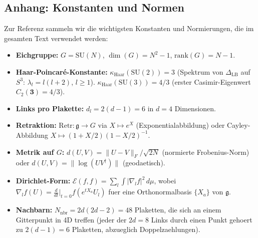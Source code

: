 \documentclass[12pt,a4paper]{article}
\theoremstyle{definition}
\theoremstyle{plain}
\theoremstyle{remark}
\begin{document}
\subsection*{Anhang: Konstanten und Normen}
\label{app:constants}

Zur Referenz sammeln wir die wichtigsten Konstanten und Normierungen, die im gesamten Text verwendet werden:

\begin{itemize}
\item \textbf{Eichgruppe:} $G = \mathrm{SU}(N)$, $\dim(G) = N^2 - 1$, $\mathrm{rank}(G) = N-1$.
\item \textbf{Haar-Poincar\'e-Konstante:} $\kappa_{\mathrm{Haar}}(\mathrm{SU}(2)) = 3$ (Spektrum von $\Delta_{\mathrm{LB}}$ auf $S^3$: $\lambda_l = l(l+2)$, $l \geq 1$). $\kappa_{\mathrm{Haar}}(\mathrm{SU}(3)) = 4/3$ (erster Casimir-Eigenwert $C_2(\mathbf{3}) = 4/3$).
\item \textbf{Links pro Plakette:} $d_l = 2(d-1) = 6$ in $d = 4$ Dimensionen.
\item \textbf{Retraktion:} $\mathrm{Retr}: \mathfrak{g} \to G$ via $X \mapsto e^X$ (Exponentialabbildung) oder Cayley-Abbildung $X \mapsto (1 + X/2)(1 - X/2)^{-1}$.
\item \textbf{Metrik auf $G$:} $d(U, V) = \|U - V\|_F / \sqrt{2N}$ (normierte Frobenius-Norm) oder $d(U, V) = \|\log(U V^\dagger)\|$ (geodaetisch).
\item \textbf{Dirichlet-Form:} $\mathcal{E}(f, f) = \sum_l \int |\nabla_l f|^2 \, d\mu$, wobei $\nabla_l f(U) = \frac{d}{dt}\big|_{t=0} f(e^{tX_a} U_l)$ fuer eine Orthonormalbasis $\{X_a\}$ von $\mathfrak{g}$.
\item \textbf{Nachbarn:} $N_{\mathrm{nbr}} = 2d(2d - 2) = 48$ Plaketten, die sich an einem Gitterpunkt in 4D treffen (jeder der $2d = 8$ Links durch einen Punkt gehoert zu $2(d-1) = 6$ Plaketten, abzueglich Doppelzaehlungen).
\end{itemize}
\end{document}
